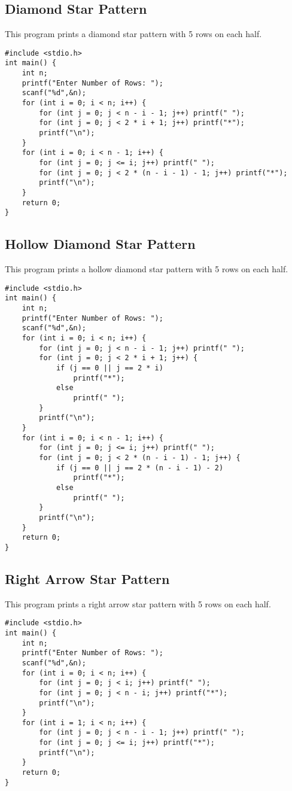 \documentclass[a4paper,12pt]{article}
\begin{document}
\subsection{Diamond Star Pattern}
This program prints a diamond star pattern with 5 rows on each half.
\begin{lstlisting}[caption={Diamond Star Pattern}]
#include <stdio.h>
int main() {
    int n;
    printf("Enter Number of Rows: ");
    scanf("%d",&n);
    for (int i = 0; i < n; i++) {
        for (int j = 0; j < n - i - 1; j++) printf(" ");
        for (int j = 0; j < 2 * i + 1; j++) printf("*");
        printf("\n");
    }
    for (int i = 0; i < n - 1; i++) {
        for (int j = 0; j <= i; j++) printf(" ");
        for (int j = 0; j < 2 * (n - i - 1) - 1; j++) printf("*");
        printf("\n");
    }
    return 0;
}
\end{lstlisting}
\clearpage

\subsection{Hollow Diamond Star Pattern}
This program prints a hollow diamond star pattern with 5 rows on each half.
\begin{lstlisting}[caption={Hollow Diamond Star Pattern}]
#include <stdio.h>
int main() {
    int n;
    printf("Enter Number of Rows: ");
    scanf("%d",&n);
    for (int i = 0; i < n; i++) {
        for (int j = 0; j < n - i - 1; j++) printf(" ");
        for (int j = 0; j < 2 * i + 1; j++) {
            if (j == 0 || j == 2 * i)
                printf("*");
            else
                printf(" ");
        }
        printf("\n");
    }
    for (int i = 0; i < n - 1; i++) {
        for (int j = 0; j <= i; j++) printf(" ");
        for (int j = 0; j < 2 * (n - i - 1) - 1; j++) {
            if (j == 0 || j == 2 * (n - i - 1) - 2)
                printf("*");
            else
                printf(" ");
        }
        printf("\n");
    }
    return 0;
}
\end{lstlisting}
\clearpage

\subsection{Right Arrow Star Pattern}
This program prints a right arrow star pattern with 5 rows on each half.
\begin{lstlisting}[caption={Right Arrow Star Pattern}]
#include <stdio.h>
int main() {
    int n;
    printf("Enter Number of Rows: ");
    scanf("%d",&n);
    for (int i = 0; i < n; i++) {
        for (int j = 0; j < i; j++) printf(" ");
        for (int j = 0; j < n - i; j++) printf("*");
        printf("\n");
    }
    for (int i = 1; i < n; i++) {
        for (int j = 0; j < n - i - 1; j++) printf(" ");
        for (int j = 0; j <= i; j++) printf("*");
        printf("\n");
    }
    return 0;
}
\end{lstlisting}
\clearpage
\end{document}
